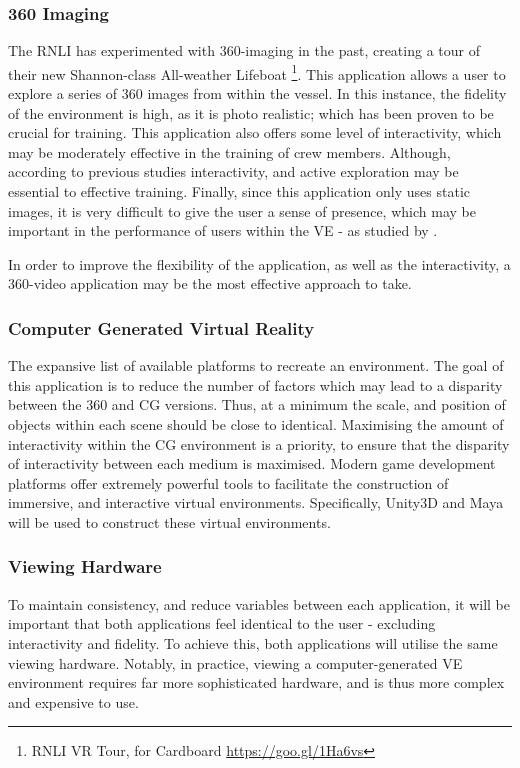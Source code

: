 \documentclass[a4paper, openright, twoside]{book}
\begin{document}
\subsubsection{360 Imaging}
The RNLI has experimented with 360-imaging in the past, creating a tour of their new Shannon-class All-weather Lifeboat \footnote{RNLI VR Tour, for Cardboard \url{https://goo.gl/1Ha6vs}}. This application allows a user to explore a series of 360 images from within the vessel. In this instance, the fidelity of the environment is high, as it is photo realistic; which has been proven to be crucial for training. This application also offers some level of interactivity, which may be moderately effective in the training of crew members. Although, according to previous studies interactivity, and active exploration may be essential to effective training. Finally, since this application only uses static images, it is very difficult to give the user a sense of presence, which may be important in the performance of users within the VE - as studied by \cite{coxon}.

In order to improve the flexibility of the application, as well as the interactivity, a 360-video application may be the most effective approach to take.

\subsubsection{Computer Generated Virtual Reality}
The expansive list of available platforms to recreate an environment. The goal of this application is to reduce the number of factors which may lead to a disparity between the 360 and CG versions. Thus, at a minimum the scale, and position of objects within each scene should be close to identical. Maximising the amount of interactivity within the CG environment is a priority, to ensure that the disparity of interactivity between each medium is maximised. Modern game development platforms offer extremely powerful tools to facilitate the construction of immersive, and interactive virtual environments. Specifically, Unity3D and Maya will be used to construct these virtual environments. 

\subsubsection{Viewing Hardware}
To maintain consistency, and reduce variables between each application, it will be important that both applications feel identical to the user - excluding interactivity and fidelity. To achieve this, both applications will utilise the same viewing  hardware. Notably, in practice, viewing a computer-generated VE environment requires far more sophisticated hardware, and is thus more complex and expensive to use. 
\end{document}
